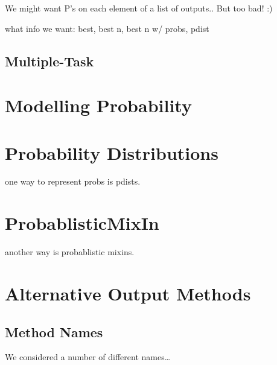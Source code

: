 \documentclass[11pt]{article}
\begin{document}
      We might want P's on each element of a list of outputs..  But
      too bad! :)

    what info we want: best, best n, best n w/ probs, pdist    

  \subsection{Multiple-Task}

\section{Modelling Probability}
  \section{Probability Distributions}

    one way to represent probs is pdists.

  \section{ProbablisticMixIn}

    another way is probablistic mixins.

\section{Alternative Output Methods}

  \subsection{Method Names}

  We considered a number of different names\ldots
\end{document}
